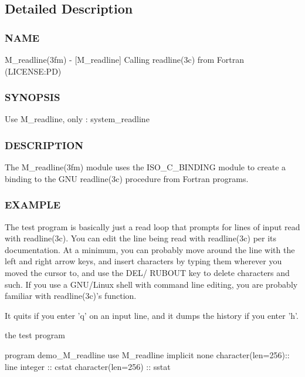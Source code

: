 \subsection{Detailed Description}
\subsubsection*{N\+A\+ME}

M\+\_\+readline(3fm) -\/ \mbox{[}M\+\_\+readline\mbox{]} Calling readline(3c) from Fortran (L\+I\+C\+E\+N\+SE\+:PD) \subsubsection*{S\+Y\+N\+O\+P\+S\+IS}

Use M\+\_\+readline, only \+: system\+\_\+readline \subsubsection*{D\+E\+S\+C\+R\+I\+P\+T\+I\+ON}

\begin{DoxyVerb}The M_readline(3fm) module uses the ISO_C_BINDING module to create a
binding to the GNU readline(3c) procedure from Fortran programs.
\end{DoxyVerb}


\subsubsection*{E\+X\+A\+M\+P\+LE}

\begin{DoxyVerb}The test program is basically just a read loop that prompts for
lines of input read with readline(3c). You can edit the line being
read with readline(3c) per its documentation. At a minimum, you can
probably move around the line with the left and right arrow keys, and
insert characters by typing them wherever you moved the cursor to,
and use the DEL/ RUBOUT key to delete characters and such. If you use
a GNU/Linux shell with command line editing, you are probably familiar
with readline(3c)'s function.

It quits if you enter 'q' on an input line, and it dumps the history if
you enter 'h'.
\end{DoxyVerb}


the test program

program demo\+\_\+\+M\+\_\+readline use M\+\_\+readline implicit none character(len=256)\+:\+: line integer \+:\+: cstat character(len=256) \+:\+: sstat

